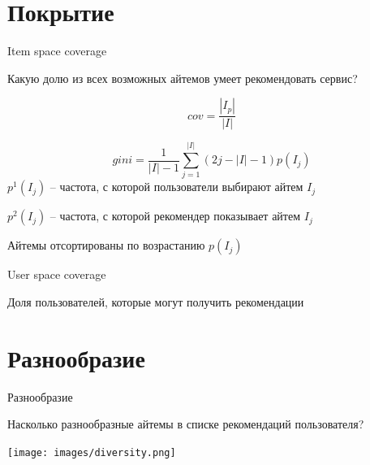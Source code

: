 \documentclass[11pt,aspectratio=169,handout]{beamer}
\begin{document}
\section{Покрытие}

\begin{frame}{Item space coverage}

\begin{tcolorbox}[colback=info!5,colframe=info!80,title=]
Какую долю из всех возможных айтемов умеет рекомендовать сервис?
\end{tcolorbox}

\[
cov = \frac{| I_p |}{| I |}
\]

\[
gini = \frac{1}{| I | - 1} \sum_{j=1}^{| I |}(2 j - | I | - 1) p(I_j)
\]
$p^1(I_j)$ -- частота, с которой пользователи выбирают айтем $I_j$ 

$p^2(I_j)$ -- частота, с которой рекомендер показывает айтем $I_j$ 

Айтемы отсортированы по возрастанию $p(I_j)$ 

\end{frame}

\begin{frame}{User space coverage}

\begin{tcolorbox}[colback=info!5,colframe=info!80,title=]
Доля пользователей, которые могут получить рекомендации
\end{tcolorbox}

\end{frame}

\section{Разнообразие}

\begin{frame}{Разнообразие \cite{KUNAVER}}

\begin{tcolorbox}[colback=info!5,colframe=info!80,title=]
[diversity] Насколько разнообразные айтемы в списке рекомендаций пользователя?
\end{tcolorbox}

\begin{center}
\texttt{[image: images/diversity.png]}
\end{center}

\end{frame}
\end{document}
